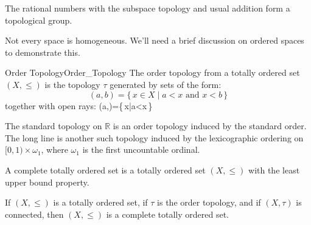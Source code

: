 \documentclass{article}                                                        %
\begin{document}
        \begin{example}
            The rational numbers with the subspace topology and usual addition
            form a topological group.
        \end{example}
        Not every space is homogeneous. We'll need a brief discussion on
        ordered spaces to demonstrate this.
        \begin{fdefinition}{Order Topology}{Order_Topology}
            The order topology from a totally ordered set $(X,\leq)$ is
            the topology $\tau$ generated by sets of the form:
            \begin{equation}
                (a,b)=\{\,x\in{X}\;|\;a<x\textrm{ and }x<b\,\}
            \end{equation}
            together with open rays:
                        {(a,\infty)=\{\,x\;|\;a<x\,\}}
        \end{fdefinition}
        \begin{example}
                The standard topology on $\mathbb{R}$ is an order topology
                induced by the standard order. The long line is another such
                topology induced by the lexicographic ordering on
                $[0,1)\times\omega_{1}$, where $\omega_{1}$ is the first
                uncountable ordinal.
        \end{example}
        \begin{definition}
                A complete totally ordered set is a totally ordered set
                $(X,\leq)$ with the least upper bound property.
        \end{definition}
        \begin{theorem}
                If $(X,\leq)$ is a totally ordered set, if $\tau$ is the order
                topology, and if $(X,\tau)$ is connected, then $(X,\leq)$ is
                a complete totally ordered set.
        \end{theorem}
\end{document}

